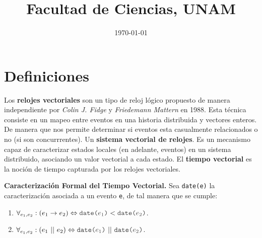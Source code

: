 \documentclass{article}
\title{Facultad de Ciencias, UNAM}
\date{\today}
\newcommand{\code}[1]{\textcolor{white!25!black}{\texttt{#1}}}
\begin{document}


\newpage

\section{Definiciones}

Los \textbf{relojes vectoriales} son un tipo de
reloj lógico propuesto de manera independiente por
\textit{Colin J. Fidge} y \textit{Friedemann Mattern}
en 1988. 
Esta técnica consiste en un mapeo entre eventos en una
historia distribuida y vectores enteros.
De manera que nos permite determinar si eventos esta casualmente 
relacionados o no (si son concurrrentes). 
Un \textbf{sistema vectorial de relojes}. Es un mecanismo capaz 
de caracterizar estados locales (en adelante, eventos) en un sistema
distribuido, asociando un valor vectorial a cada estado.
El \textbf{tiempo vectorial} es la noción de tiempo capturada
por los relojes vectoriales.

\textbf{Caracterización Formal del Tiempo Vectorial.} Sea
\code{date(e)} la caracterización asociada a un evento \code{e},
de tal manera que se cumple:
\begin{enumerate}
\item $\forall_{e_1, e_2}:\left(e_1 \rightarrow e_2\right)
  \Leftrightarrow \code{date($e_1$)} < \code{date($e_2$)}$.
\item $\forall_{e_1, e_2}: \left(e_1\ ||\ e_2\right) \Leftrightarrow
  \code{date($e_1$)}\ ||\ \code{date($e_2$)}$.
\end{enumerate}
\end{document}
